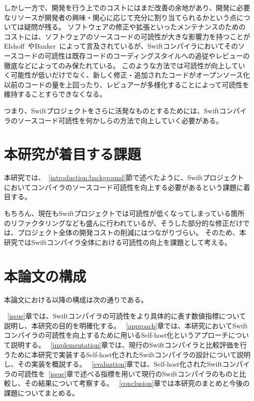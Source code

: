 しかし一方で、開発を行う上でのコストにはまだ改善の余地があり、開発に必要なリソースが開発者の興味・関心に応じて充分に割り当てられるかという点については疑問が残る。
ソフトウェアの修正や拡張といったメンテナンスのためのコストには、ソフトウェアのソースコードの可読性が大きな影響力を持つことがElshoff~\cite{elshoff}やBanker~\cite{banker-datar, banker-davis}によって言及されているが、Swiftコンパイラにおいてそのソースコードの可読性は既存コードのコーディングスタイルへの追従やレビューの徹底などによってのみ保たれている。
このような方法では可読性が向上していく可能性が低いだけでなく、新しく修正・追加されたコードがオープンソース化以前のコードの量を上回ったり、レビュアーが多様化することによって可読性を維持することすらできなくなる。

つまり、Swiftプロジェクトをさらに活発なものとするためには、Swiftコンパイラのソースコード可読性を何かしらの方法で向上していく必要がある。

\section{本研究が着目する課題}
\label{introduction:issue}

本研究では、~\ref{introduction:background}節で述べたように、Swiftプロジェクトにおいてコンパイラのソースコード可読性を向上する必要があるという課題に着目する。

もちろん、現在もSwiftプロジェクトでは可読性が低くなってしまっている箇所のリファクタリングなども盛んに行われているが、そうした部分的な修正だけでは、プロジェクト全体の開発コストの削減にはつながりづらい。
そのため、本研究ではSwiftコンパイラ全体における可読性の向上を課題として考える。

\section{本論文の構成}

本論文における以降の構成は次の通りである。

~\ref{issue}章では、Swiftコンパイラの可読性をより具体的に表す数値指標について説明し、本研究の目的を明確化する。
~\ref{approach}章では、本研究においてSwiftコンパイラの可読性を向上するために用いるSelf-host化というアプローチについて説明する。
~\ref{implementation}章では、現行のSwiftコンパイラと比較評価を行うために本研究で実装するSelf-host化されたSwiftコンパイラの設計について説明し、その実装を概説する。
~\ref{evaluation}章では、Self-host化されたSwiftコンパイラの可読性を~\ref{issue}章で述べる指標を用いて現行のSwiftコンパイラのものと比較し、その結果について考察する。
~\ref{conclusion}章では本研究のまとめと今後の課題についてまとめる。

